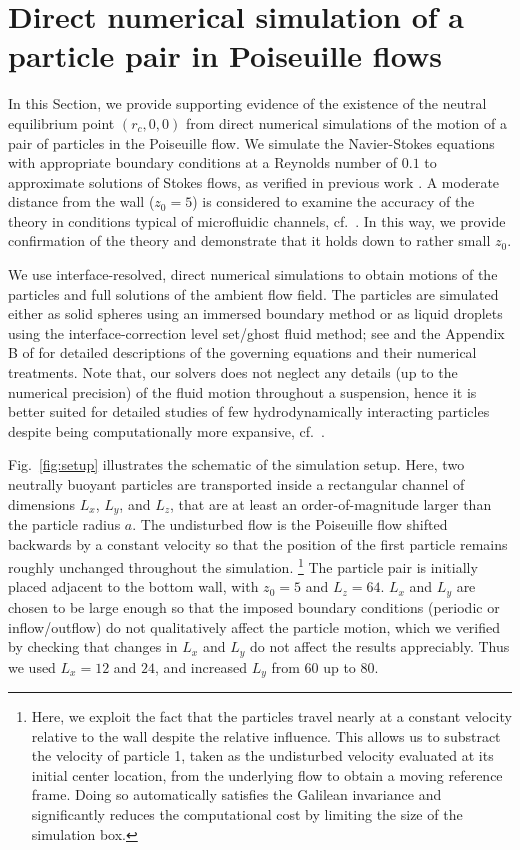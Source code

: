 \section{Direct numerical simulation of a particle pair in Poiseuille flows}\label{dns}

In this Section, we provide supporting evidence of the existence of the neutral equilibrium point $(r_c, 0, 0)$ from direct numerical simulations of the motion of a pair of particles in the Poiseuille flow. We simulate the Navier-Stokes equations with appropriate boundary conditions at a Reynolds number of $0.1$ to approximate solutions of Stokes flows, as verified in previous work \citep{ibm,Fouxon_2017}. A moderate distance from the wall ($z_0=5$) is considered to examine the accuracy of the theory in conditions typical of microfluidic channels, cf.\ \cite{tabeling,flow-assist}. In this way, we provide confirmation of the theory and demonstrate that it holds down to rather small $z_0$.

We use interface-resolved, direct numerical simulations to obtain motions of the particles and full solutions of the ambient flow field. The particles are simulated either as solid spheres using an immersed boundary method or as liquid droplets using the interface-correction level set/ghost fluid method; see \cite{ibm,icls,flow-assist} and the Appendix B of \cite{Fouxon_2017} for detailed descriptions of the governing equations and their numerical treatments. Note that, our solvers does not neglect any details (up to the numerical precision) of the fluid motion throughout a suspension, hence it is better suited for detailed studies of few hydrodynamically interacting particles despite being computationally more expansive, cf.\ \cite{Swan_Brady_2007}.

Fig.\ \ref{fig:setup} illustrates the schematic of the simulation setup. Here, two neutrally buoyant particles are transported inside a rectangular channel of dimensions $L_x$, $L_y$, and $L_z$, that are at least an order-of-magnitude larger than the particle radius $a$. The undisturbed flow is the Poiseuille flow shifted backwards by a constant velocity so that the position of the first particle remains roughly unchanged throughout the simulation.%
\footnote{Here, we exploit the fact that the particles travel nearly at a constant velocity relative to the wall despite the relative influence. This allows us to substract the velocity of particle 1, taken as the undisturbed velocity evaluated at its initial center location, from the underlying flow to obtain a moving reference frame. Doing so automatically satisfies the Galilean invariance and significantly reduces the computational cost by limiting the size of the simulation box.}
The particle pair is initially placed adjacent to the bottom wall, with $z_0=5$ and $L_z=64$. $L_x$ and $L_y$ are chosen to be large enough so that the imposed boundary conditions (periodic or inflow/outflow) do not qualitatively affect the particle motion, which we verified by checking that changes in $L_x$ and $L_y$ do not affect the results appreciably. Thus we used $L_x=12$ and $24$, and increased $L_y$ from $60$ up to $80$.

